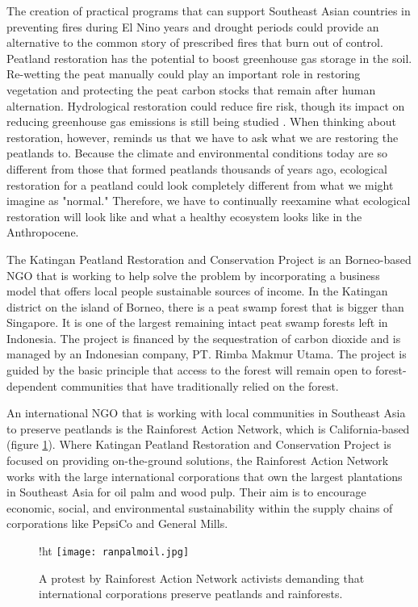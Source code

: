 The creation of practical programs that can support Southeast Asian countries in preventing fires during El Nino years and drought periods could provide an alternative to the common story of prescribed fires that burn out of control. Peatland restoration has the potential to boost greenhouse gas storage in the soil. Re-wetting the peat manually could play an important role in restoring vegetation and protecting the peat carbon stocks that remain after human alternation. Hydrological restoration could reduce fire risk, though its impact on reducing greenhouse gas emissions is still being studied \citep{page2009restoration}. When thinking about restoration, however, \citet{holden2005peatland} reminds us that we have to ask what we are restoring the peatlands to. Because the climate and environmental conditions today are so different from those that formed peatlands thousands of years ago, ecological restoration for a peatland could look completely different from what we might imagine as "normal." Therefore, we have to continually reexamine what ecological restoration will look like and what a healthy ecosystem looks like in the Anthropocene.

The Katingan Peatland Restoration and Conservation Project is an Borneo-based NGO that is working to help solve the problem by incorporating a business model that offers local people sustainable sources of income. In the Katingan district on the island of Borneo, there is a peat swamp forest that is bigger than Singapore. It is one of the largest remaining intact peat swamp forests left in Indonesia. The project is financed by the sequestration of carbon dioxide and is managed by an Indonesian company, PT. Rimba Makmur Utama. The project is guided by the basic principle that access to the forest will remain open to forest-dependent communities that have traditionally relied on the forest.

An international NGO that is working with local communities in Southeast Asia to preserve peatlands is the Rainforest Action Network, which is California-based (figure \ref{fig:ranpalmoil}). Where Katingan Peatland Restoration and Conservation Project is focused on providing on-the-ground solutions, the Rainforest Action Network works with the large international corporations that own the largest plantations in Southeast Asia for oil palm and wood pulp. Their aim is to encourage economic, social, and environmental sustainability within the supply chains of corporations like PepsiCo and General Mills.

\begin{figure}{!ht}
  \texttt{[image: ranpalmoil.jpg]}
  \caption{A protest by Rainforest Action Network activists demanding that international corporations preserve peatlands and rainforests.}
  \label{fig:ranpalmoil}
\end{figure}

